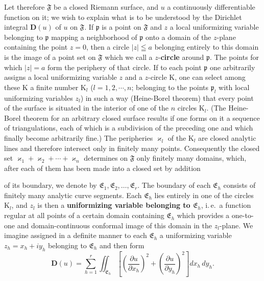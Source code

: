 \documentclass{article}
\begin{document}
Let therefore $\mathfrak{F}$ be a closed Riemann surface, and $u$ a continuously differentiable function on it; we wish to explain what is to be understood by the Dirichlet integral $\mathbf{D}(u)$ of $u$ on $\mathfrak{F}$. If $\mathfrak{p}$ is a point on $\mathfrak{F}$ and $z$ a local uniformizing variable belonging to $\mathfrak{p}$ mapping a neighborhood of $\mathfrak{p}$ onto a domain of the $z$-plane containing the point $z = 0$, then a circle $|z| \leqq a$ belonging entirely to this domain is the image of a point set on $\mathfrak{F}$ which we call a $z$-\textbf{circle} around $\mathfrak{p}$. The points for which $|z| = a$ form the periphery of that circle. If to each point $\mathfrak{p}$ one arbitrarily assigns a local uniformizing variable $z$ and a $z$-circle $\mathrm{K}$, one can select among these $\mathrm{K}$ a finite number $\mathrm{K}_l$ ($l = 1, 2, \cdots, n$; belonging to the points $\mathfrak{p}_l$ with local uniformizing variables $z_l$) in such a way (Heine-Borel theorem) that every point of the surface is situated in the interior of one of the $n$ circles $\mathrm{K}_l$. (The Heine-Borel theorem for an arbitrary closed surface results if one forms on it a sequence of triangulations, each of which is a subdivision of the preceding one and which finally become arbitrarily fine.) The peripheries $\varkappa_l$ of the $\mathrm{K}_l$ are closed analytic lines and therefore intersect only in finitely many points. Consequently the closed set $\varkappa_1 + \varkappa_2 + \cdots + \varkappa_n$ determines on $\mathfrak{F}$ only finitely many domains, which, after each of them has been made into a closed set by addition

of its boundary, we denote by $\mathfrak{E}_1, \mathfrak{E}_2, \dots, \mathfrak{E}_r$. The boundary of each $\mathfrak{E}_h$ consists of finitely many analytic curve segments. Each $\mathfrak{E}_h$ lies entirely in one of the circles $\mathrm{K}_l$, and $z_l$ is then a \textbf{uniformizing variable belonging to $\mathfrak{E}_h$}, i.\,e.\ a function regular at all points of a certain domain containing $\mathfrak{E}_h$ which provides a one-to-one and domain-continuous conformal image of this domain in the $z_l$-plane. We imagine assigned in a definite manner to each $\mathfrak{E}_h$ a uniformizing variable $z_h = x_h + i y_h$ belonging to $\mathfrak{E}_h$ and then form
\[ \mathbf{D}(u) = \sum_{h=1}^r \iint_{\mathfrak{E}_h} \left[ \left(\frac{\partial u}{\partial x_h}\right)^2 + \left(\frac{\partial u}{\partial y_h}\right)^2 \right] dx_h\,dy_h. \]
\end{document}
